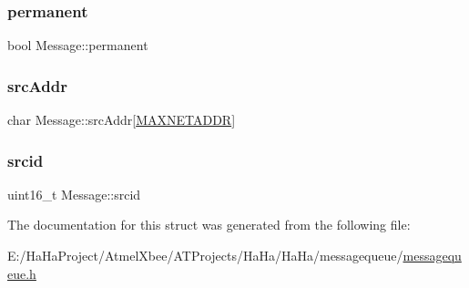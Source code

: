 \mbox{\label{struct_message_a68480c18c3f3c0795af5200914696b33}} 
\subsubsection{\texorpdfstring{permanent}{permanent}}
{\footnotesize\ttfamily bool Message\+::permanent}

\mbox{\label{struct_message_a012f65c4847cc68c06ca5630b6652e0b}} 
\subsubsection{\texorpdfstring{src\+Addr}{srcAddr}}
{\footnotesize\ttfamily char Message\+::src\+Addr\mbox{[}\hyperlink{haha_utils_8h_a64e48eb75238bd3d7a053f19071044a8}{M\+A\+X\+N\+E\+T\+A\+D\+DR}\mbox{]}}

\mbox{\label{struct_message_a58696ceb3c9b42f0647843f2c4934d8f}} 
\subsubsection{\texorpdfstring{srcid}{srcid}}
{\footnotesize\ttfamily uint16\+\_\+t Message\+::srcid}



The documentation for this struct was generated from the following file\+:\begin{DoxyCompactItemize}
\item 
E\+:/\+Ha\+Ha\+Project/\+Atmel\+Xbee/\+A\+T\+Projects/\+Ha\+Ha/\+Ha\+Ha/messagequeue/\hyperlink{messagequeue_8h}{messagequeue.\+h}\end{DoxyCompactItemize}
